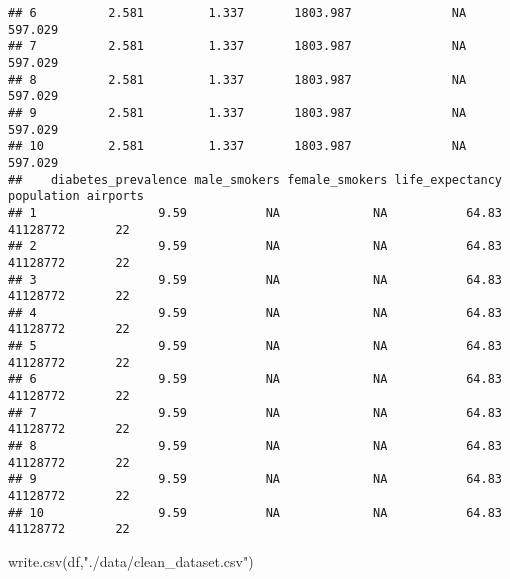 \documentclass[
]{article}
\newenvironment{Shaded}{\begin{snugshade}}{\end{snugshade}}
\newcommand{\KeywordTok}[1]{\textcolor[rgb]{0.94,0.87,0.69}{#1}}
\newcommand{\NormalTok}[1]{\textcolor[rgb]{0.80,0.80,0.80}{#1}}
\newcommand{\StringTok}[1]{\textcolor[rgb]{0.80,0.58,0.58}{#1}}
\begin{document}
\begin{verbatim}
## 6          2.581         1.337       1803.987              NA               597.029
## 7          2.581         1.337       1803.987              NA               597.029
## 8          2.581         1.337       1803.987              NA               597.029
## 9          2.581         1.337       1803.987              NA               597.029
## 10         2.581         1.337       1803.987              NA               597.029
##    diabetes_prevalence male_smokers female_smokers life_expectancy population airports
## 1                 9.59           NA             NA           64.83   41128772       22
## 2                 9.59           NA             NA           64.83   41128772       22
## 3                 9.59           NA             NA           64.83   41128772       22
## 4                 9.59           NA             NA           64.83   41128772       22
## 5                 9.59           NA             NA           64.83   41128772       22
## 6                 9.59           NA             NA           64.83   41128772       22
## 7                 9.59           NA             NA           64.83   41128772       22
## 8                 9.59           NA             NA           64.83   41128772       22
## 9                 9.59           NA             NA           64.83   41128772       22
## 10                9.59           NA             NA           64.83   41128772       22
\end{verbatim}

\begin{Shaded}
\begin{Highlighting}[]
\KeywordTok{write.csv}\NormalTok{(df,}\StringTok{"./data/clean_dataset.csv"}\NormalTok{)}
\end{Highlighting}
\end{Shaded}
\end{document}
